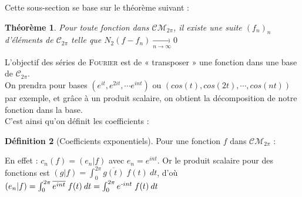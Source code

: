 \documentclass[11pt,a4paper]{report}
\newtheorem{theorem}{Théorème}[chapter]
\theoremstyle{definition}
\newtheorem{dfn}[theorem]{Définition}
\begin{document}
Cette sous-section se base sur le théorème suivant : 
\begin{theorem}
Pour toute fonction dans $\mathcal{CM}_{2\pi}$, il existe une suite $\left( f_n \right)_n$ d'éléments de $\mathcal{C}_{2\pi}$ telle que $\boxed{N_2(f-f_n)\xrightarrow[n\to\infty]{} 0}$
\end{theorem}

L'objectif des séries de \textsc{Fourier} est de « transposer » une fonction dans une base de $\mathcal{C}_{2\pi}$. \\

On prendra pour bases $(e^{it},e^{2it},\cdots e^{int})$ ou $\left( cos(t),cos(2t),\cdots ,cos(nt)\right)$ par exemple, et grâce à un produit scalaire, on obtient la décomposition de notre fonction dans la base.\\
C'est ainsi qu'on définit les coefficients : 


\begin{dfn}[Coefficients exponentiels]
Pour une fonction $f$ dans $\mathcal{CM}_{2\pi}$ :\\
\begin{center}
 \end{center}

En effet : $c_n(f) = (e_n | f)$ avec $e_n = e^{int}$. Or le produit scalaire pour des fonctions est $(g|f)=\int_0^{2\pi} \overline{g(t)}\; f(t) \: dt$, d'où $(e_n|f)=\int_0^{2\pi} \overline{e^{int}}\; f(t) \: dt=\int_0^{2\pi} e^{\emph{-}int}\; f(t) \: dt$
\end{dfn}
\end{document}
